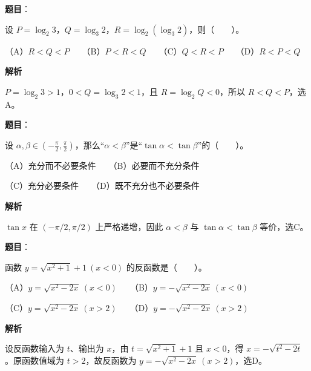 \begin{answer}

\textbf{题目}：

设 $P=\log_2 3$，$Q=\log_3 2$，$R=\log_2(\log_3 2)$，则\mbox{（　　）}。

（A）$R<Q<P$　　（B）$P<R<Q$　　（C）$Q<R<P$　　（D）$R<P<Q$

\textbf{解析}

$P=\log_2 3>1$，$0<Q=\log_3 2<1$，且 $R=\log_2Q<0$，所以 $R<Q<P$，选A。


\end{answer}
\begin{answer}

\textbf{题目}：

设 $\alpha,\beta\in(-\frac\pi2,\frac\pi2)$，那么“$\alpha<\beta$”是“$\tan\alpha<\tan\beta$”的\mbox{（　　）}。

（A）充分而不必要条件　　（B）必要而不充分条件

（C）充分必要条件　　（D）既不充分也不必要条件

\textbf{解析}

$\tan x$ 在 $(-\pi/2,\pi/2)$ 上严格递增，因此 $\alpha<\beta$ 与 $\tan\alpha<\tan\beta$ 等价，选C。


\end{answer}
\begin{answer}

\textbf{题目}：

函数 $y=\sqrt{x^2+1}+1\ (x<0)$ 的反函数是\mbox{（　　）}。

（A）$y=\sqrt{x^2-2x}\ (x<0)$　　（B）$y=-\sqrt{x^2-2x}\ (x<0)$

（C）$y=\sqrt{x^2-2x}\ (x>2)$　　（D）$y=-\sqrt{x^2-2x}\ (x>2)$

\textbf{解析}

设反函数输入为 $t$、输出为 $x$，由 $t=\sqrt{x^2+1}+1$ 且 $x<0$，得 $x=-\sqrt{t^2-2t}$。原函数值域为 $t>2$，故反函数为 $y=-\sqrt{x^2-2x}\ (x>2)$，选D。


\end{answer}
